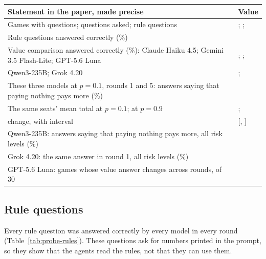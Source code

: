 \documentclass[10pt]{article}
\makeatletter
\let\plainsubsection\subsection
\renewcommand{\subsection}{\FloatBarrier\needspace{8\baselineskip}\plainsubsection}
\newenvironment{claims}{\small\begin{tabular}{@{}>{\raggedright\arraybackslash}p{0.74\textwidth}>{\raggedleft\arraybackslash}p{0.2\textwidth}@{}}\toprule Statement in the paper, made precise & Value \\\midrule}{\bottomrule\end{tabular}}
\makeatother
\begin{document}
\begin{center}
\begin{claims}
Games with questions; questions asked; rule questions & \ProbeGames{}; \ProbeQuestions{}; \ProbeRuleQuestions{} \\
Rule questions answered correctly (\%) & \ProbeRulePct{} \\
Value comparison answered correctly (\%): Claude Haiku 4.5; Gemini 3.5 Flash-Lite; GPT-5.6 Luna & \ProbeCorrectHaikuPct{}; \ProbeCorrectFlashPct{}; \ProbeCorrectLunaPct{} \\
\quad Qwen3-235B; Grok 4.20 & \ProbeCorrectQwenPct{}; \ProbeCorrectGrokPct{} \\
These three models at $p=0.1$, rounds 1 and 5: answers saying that paying nothing pays more (\%) & \ProbeThreeLowKeepPct{} \\
The same seats' mean total at $p=0.1$; at $p=0.9$ & \ProbeThreeLowContrib{}; \ProbeThreeHighContrib{} \\
\quad change, with interval & \ProbeThreeRiskShift{} [\ProbeThreeRiskShiftLo, \ProbeThreeRiskShiftHi] \\
Qwen3-235B: answers saying that paying nothing pays more, all risk levels (\%) & \ProbeQwenKeepPct{} \\
Grok 4.20: the same answer in round 1, all risk levels (\%) & \ProbeGrokRoundOneKeepPct{} \\
GPT-5.6 Luna: games whose value answer changes across rounds, of 30 & \ProbeLunaSwitchGames{} \\
\end{claims}
\end{center}



\subsection{Rule questions}

Every rule question was answered correctly by every model in every round (Table~\ref{tab:probe-rules}). These questions ask for numbers printed in the prompt, so they show that the agents read the rules, not that they can use them.

\begin{table}[h]
\caption{Rule questions: share answered correctly (\%), with the number of answers in brackets.}
\label{tab:probe-rules}
\centering\small

\end{table}
\end{document}
